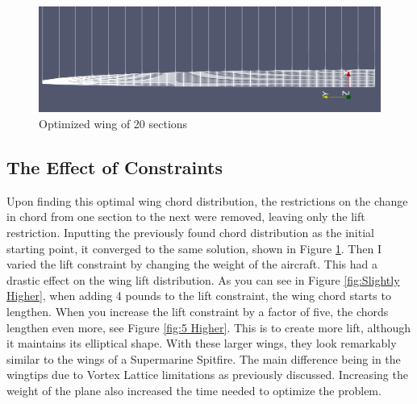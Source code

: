 \documentclass{article}
\begin{document}
\begin{figure}[h]
\centering
\includegraphics[width=\textwidth]{HIGH RES FOCUSED.png}
\caption{Optimized wing of 20 sections}
\label{fig:High Res}
\end{figure}

\subsection{The Effect of Constraints}
Upon finding this optimal wing chord distribution, the restrictions on the change in chord from one section to the next were removed, leaving only the lift restriction. Inputting the previously found chord distribution as the initial starting point, it converged to the same solution, shown in Figure \ref{fig:High Res}. Then I varied the lift constraint by changing the weight of the aircraft. This had a drastic effect on the wing lift distribution. As you can see in Figure \ref{fig:Slightly Higher}, when adding 4 pounds to the lift constraint, the wing chord starts to lengthen. When you increase the lift constraint by a factor of five, the chords lengthen even more, see Figure \ref{fig:5 Higher}. This is to create more lift, although it maintains its elliptical shape. With these larger wings, they look remarkably similar to the wings of a Supermarine Spitfire. The main difference being in the wingtips due to Vortex Lattice limitations as previously discussed. Increasing the weight of the plane also increased the time needed to optimize the problem.
\end{document}
